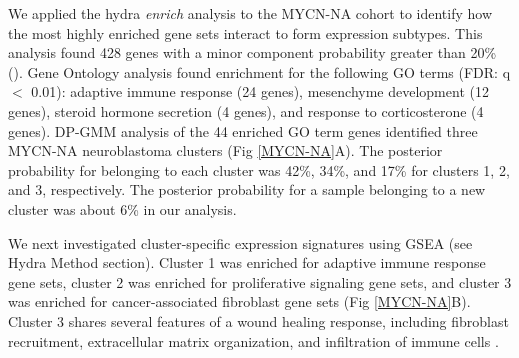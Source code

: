 \documentclass[10pt,letterpaper]{article}
\begin{document}
We applied the hydra \textit{enrich} analysis to the MYCN-NA cohort to identify how the most highly enriched gene sets interact to form expression subtypes. This analysis found 428 genes with a minor component probability greater than 20\% (). Gene Ontology analysis found enrichment for the following GO terms (FDR: q $<$ 0.01): adaptive immune response (24 genes), mesenchyme development (12 genes), steroid hormone secretion (4 genes), and response to corticosterone (4 genes). DP-GMM analysis of the 44 enriched GO term genes identified three MYCN-NA neuroblastoma clusters (Fig \ref{MYCN-NA}A). The posterior probability for belonging to each cluster was 42\%, 34\%, and 17\% for clusters 1, 2, and 3, respectively. The posterior probability for a sample belonging to a new cluster was about 6\% in our analysis.

We next investigated cluster-specific expression signatures using GSEA (see Hydra Method section). Cluster 1 was enriched for adaptive immune response gene sets, cluster 2 was enriched for proliferative signaling gene sets, and cluster 3 was enriched for cancer-associated fibroblast gene sets (Fig \ref{MYCN-NA}B). Cluster 3 shares several features of a wound healing response, including fibroblast recruitment, extracellular matrix organization, and infiltration of immune cells \cite{fosterEvolvingRelationshipWound}.
\end{document}
